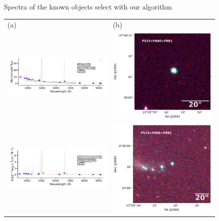\documentclass[fleqn,usenatbib]{mnras}
\begin{document}
\begin{figure}
\begin{tabular}{ll}
  \end{tabular}
  \caption{Spectra of the known objects select with our algorithm }
  \label{fig:color-diagram}
\end{figure}

\begin{figure}
  \setlength\tabcolsep{0pt}
  \begin{tabular}{ll}
    (a) & (b) \\
    \includegraphics[trim=10 0 5 10, clip]{Figs/StenholmAcker_pn_g006_0-41_9_id176-SPLUS-s29s46-072842.pdf} & \includegraphics[width=0.2\linewidth, trim=10 0 5 5, clip]{Figs/PNG006_316--37_100_F660-RGB.pdf} \\
     \includegraphics[trim=10 0 5 10, clip]{Figs/spec-0680-52200-0153-STRIPE82-0159-019049.pdf} & \includegraphics[width=0.2\linewidth, trim=10 0 5 5, clip]{Figs/GALEX24170_351-0_200_F660-RGB.pdf} \\

\end{tabular}
\end{figure}
\end{document}
